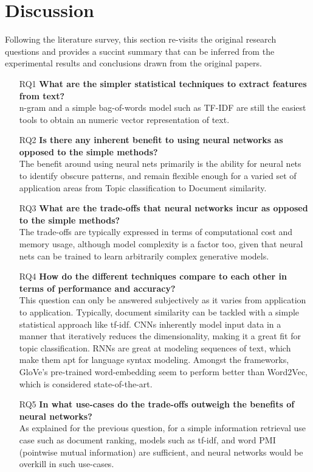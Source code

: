 \documentclass[11pt,a4paper]{article}
\begin{document}


\section{Discussion} %
\label{sec:discussion}

  Following the literature survey, this section re-visits the original research questions and provides a succint summary that can be inferred from the experimental results and conclusions drawn from the original papers.

  \begin{itemize}
    \item [RQ1] 
    \textbf{What are the simpler statistical techniques to extract features from text?} \\
    n-gram and a simple bag-of-words model such as TF-IDF are still the easiest tools to obtain an numeric vector representation of text.
    \item [RQ2] 
    \textbf{Is there any inherent benefit to using neural networks as opposed to the simple methods?} \\
    The benefit around using neural nets primarily is the ability for neural nets to identify obscure patterns, and remain flexible enough for a varied set of application areas from Topic classification to Document similarity.
    \item [RQ3] 
    \textbf{What are the trade-offs that neural networks incur as opposed to the simple methods?} \\
    The trade-offs are typically expressed in terms of computational cost and memory usage, although model complexity is a factor too, given that neural nets can be trained to learn arbitrarily complex generative models.
    \item [RQ4] 
    \textbf{How do the different techniques compare to each other in terms of performance and accuracy?} \\
    This question can only be answered subjectively as it varies from application to application. Typically, document similarity can be tackled with a simple statistical approach like tf-idf. CNNs inherently model input data in a manner that iteratively reduces the dimensionality, making it a great fit for topic classification. RNNs are great at modeling sequences of text, which make them apt for language syntax modeling. Amongst the frameworks, GloVe's pre-trained word-embedding seem to perform better than Word2Vec, which is considered state-of-the-art.
    \item [RQ5] 
    \textbf{In what use-cases do the trade-offs outweigh the benefits of neural networks?} \\
    As explained for the previous question, for a simple information retrieval use case such as document ranking, models such as tf-idf, and word PMI (pointwise mutual information) are sufficient, and neural networks would be overkill in such use-cases.
  \end{itemize}
\end{document}
